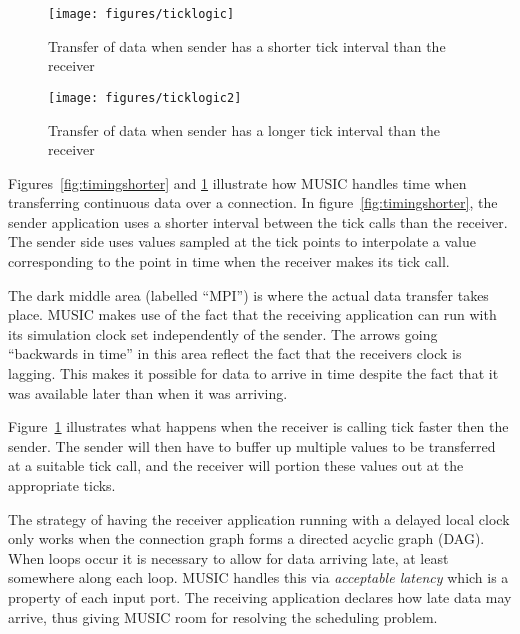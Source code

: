 \documentclass[a4paper]{report}
\begin{document}
\begin{figure}
  \begin{center}
    \begin{minipage}{0.45\textwidth}
      \texttt{[image: figures/ticklogic]}
      \caption[Timing of data transfer, slowdown]{\label{fig:timingshorter}
        Transfer of data when sender has a shorter
        tick interval than the receiver}
    \end{minipage}
    \hfill
    \begin{minipage}{0.45\textwidth}
      \texttt{[image: figures/ticklogic2]}
      \caption[Timing of data transfer, speedup]{\label{fig:timinglonger}
        Transfer of data when sender has a longer
        tick interval than the receiver}
    \end{minipage}
  \end{center}
\end{figure}

Figures~\ref{fig:timingshorter} and \ref{fig:timinglonger} illustrate
how MUSIC handles time when transferring continuous data over a connection.
In figure~\ref{fig:timingshorter}, the sender application uses a
shorter interval between the tick calls than the receiver.  The sender
side uses values sampled at the tick points to interpolate a value
corresponding to the point in time when the receiver makes its tick
call.

The dark middle area (labelled ``MPI'') is where the actual data
transfer takes place.  MUSIC makes use of the fact that the receiving
application can run with its simulation clock set independently of the
sender.  The arrows going ``backwards in time'' in this area reflect
the fact that the receivers clock is lagging.  This makes it possible
for data to arrive in time despite the fact that it was available
later than when it was arriving.

Figure~\ref{fig:timinglonger} illustrates what happens when the
receiver is calling tick faster then the sender.  The sender will then
have to buffer up multiple values to be transferred at a suitable tick
call, and the receiver will portion these values out at the
appropriate ticks.

The strategy of having the receiver application running with a delayed
local clock only works when the connection graph forms a directed
acyclic graph (DAG).
When loops occur it is necessary to allow for data arriving late, at
least somewhere along each loop.  MUSIC handles this via
\emph{acceptable latency}
which is a property of each input port.  The receiving application
declares how late data may arrive, thus giving MUSIC room for
resolving the scheduling problem.
\end{document}
